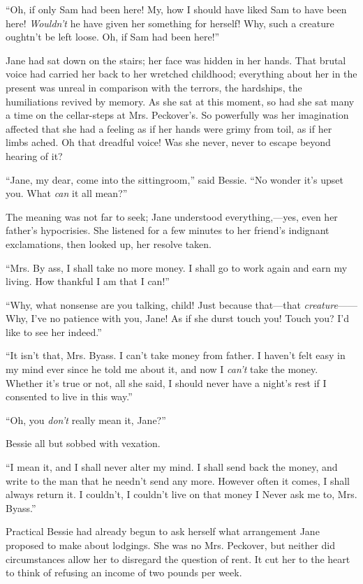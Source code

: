 ``Oh, if only Sam had been here! My, how I should have liked Sam to have
been here! \emph{Wouldn't} he have given her something for herself! Why,
such a creature oughtn't be left loose. Oh, if Sam had been here!''

Jane had sat down on the stairs; her face was hidden in her hands. That
brutal voice had carried her back to her wretched childhood; everything
about her in the present was unreal in comparison with the terrors, the
hardships, the humiliations revived by memory. As she sat at this
moment, so had she sat many a time on the cellar-steps at Mrs.
Peckover's. So powerfully was her imagination affected that she had a
feeling as {\protect\hypertarget{248}{}{}}if her hands were grimy from
toil, as if her limbs ached. Oh that dreadful voice! Was she never,
never to escape beyond hearing of it?

``Jane, my dear, come into the sittingroom,'' said Bessie. ``No wonder
it's upset you. What \emph{can} it all mean?''

The meaning was not far to seek; Jane understood everything,---yes, even
her father's hypocrisies. She listened for a few minutes to her friend's
indignant exclamations, then looked up, her resolve taken.

``Mrs. By ass, I shall take no more money. I shall go to work again and
earn my living. How thankful I am that I can!''

``Why, what nonsense are you talking, child! Just because that---that
\emph{creature}{{------}}Why, I've no patience with you, Jane! As if she
durst touch you! Touch you? I'd like to see her indeed.''

``It isn't that, Mrs. Byass. I can't take money from father. I haven't
felt easy in my mind ever since he told me about it, and now I
\emph{can't} take the money. Whether it's true or not, all she said, I
should never have a night's rest if I consented to live in this way.''

{\protect\hypertarget{249}{}{}}``Oh, you \emph{don't} really mean it,
Jane?''

Bessie all but sobbed with vexation.

``I mean it, and I shall never alter my mind. I shall send back the
money, and write to the man that he needn't send any more. However often
it comes, I shall always return it. I couldn't, I couldn't live on that
money I Never ask me to, Mrs. Byass.''

Practical Bessie had already begun to ask herself what arrangement Jane
proposed to make about lodgings. She was no Mrs. Peckover, but neither
did circumstances allow her to disregard the question of rent. It cut
her to the heart to think of refusing an income of two pounds per week.

